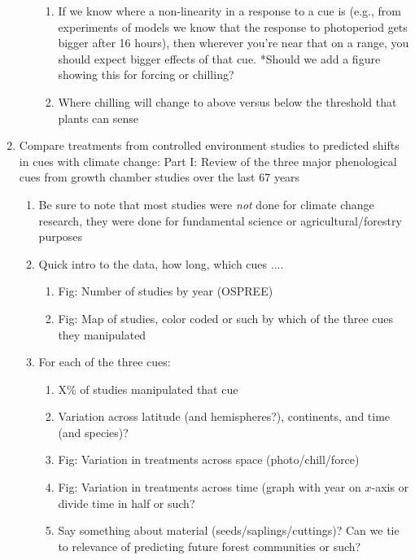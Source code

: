 \documentclass[11pt,letterpaper]{article}
\begin{document}
\begin{enumerate}
\begin{enumerate}
\begin{enumerate}
\item If we know where a non-linearity in a response to a cue is (e.g., from experiments of models we know that the response to photoperiod gets bigger after 16 hours), then wherever you're near that on a range, you should expect bigger effects of that cue. *Should we add a figure showing this for forcing or chilling? %
\item Where chilling will change to above versus below the threshold that plants can sense %
\end{enumerate}
\end{enumerate}
\item Compare treatments from controlled environment studies to predicted shifts in cues with climate change: Part I: Review of the three major phenological cues from growth chamber studies over the last 67 years %
\begin{enumerate}
\item Be sure to note that most studies were \emph{not} done for climate change research, they were done for fundamental science or agricultural/forestry purposes
\item Quick intro to the data, how long, which cues .... 
\begin{enumerate}
\item Fig: Number of studies by year (OSPREE)
\item Fig: Map of studies, color coded or such by which of the three cues they manipulated
\end{enumerate}
\item For each of the three cues:
\begin{enumerate}
\item  X\% of studies manipulated that cue
\item Variation across latitude (and hemispheres?), continents, and time (and species)? 
\item Fig: Variation in treatments across space (photo/chill/force)
\item Fig: Variation in treatments across time (graph with year on $x$-axis or divide time in half or such? 
\item Say something about material (seeds/saplings/cuttings)? Can we tie to relevance of predicting future forest communities or such?

\end{enumerate}
\end{enumerate}
\end{enumerate}
\end{document}
